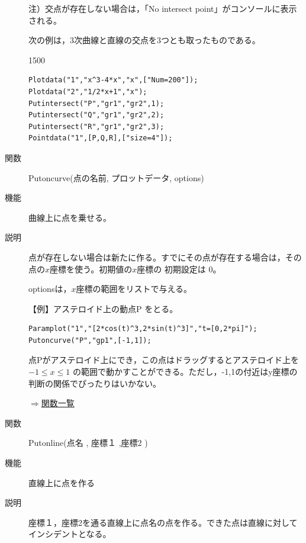 \documentclass[papersize,a4paper,10pt,uplatex]{jsarticle}
\begin{document}
\begin{description}
注）交点が存在しない場合は，「No intersect point」がコンソールに表示される。

\newpage

次の例は，3次曲線と直線の交点を3つとも取ったものである。

\begin{layer}{150}{0}
\end{layer}

\begin{verbatim}
Plotdata("1","x^3-4*x","x",["Num=200"]);
Plotdata("2","1/2*x+1","x");
Putintersect("P","gr1","gr2",1);
Putintersect("Q","gr1","gr2",2);
Putintersect("R","gr1","gr2",3);
Pointdata("1",[P,Q,R],["size=4"]);
\end{verbatim}


\vspace{\baselineskip}
\hypertarget{putoncurve}{}
\item[関数]Putoncurve(点の名前, プロットデータ, options)
\item[機能]曲線上に点を乗せる。
\item[説明]点が存在しない場合は新たに作る。すでにその点が存在する場合は，その点の$x$座標を使う。初期値の$x$座標の 初期設定は 0。

optionsは，$x$座標の範囲をリストで与える。

\vspace{\baselineskip}
【例】アステロイド上の動点P をとる。
\begin{verbatim}
Paramplot("1","[2*cos(t)^3,2*sin(t)^3]","t=[0,2*pi]");
Putoncurve("P","gp1",[-1,1]); 
\end{verbatim}
点Pがアステロイド上にでき，この点はドラッグするとアステロイド上を $-1 \leq x\leq 1$ の範囲で動かすことができる。ただし，-1,1の付近はy座標の判断の関係でぴったりはいかない。

 \begin{center} \scalebox{0.9}{} \end{center}

\begin{flushright}\hyperlink{functionlist}{$\Rightarrow$関数一覧}\end{flushright}

\hypertarget{putonline}{}
\item[関数]Putonline(点名 , 座標１ ,座標2 )
\item[機能]直線上に点を作る
\item[説明]座標１，座標2を通る直線上に点名の点を作る。できた点は直線に対してインシデントとなる。


\end{description}
\end{document}
